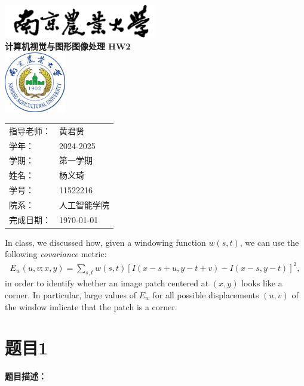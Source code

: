 \documentclass[UTF8]{ctexart}
\begin{document}
	\begin{titlepage}
		\centering
		\vspace*{2cm}
		\includegraphics[width=0.5\textwidth]{./image/name.png}\\[1cm] %
		{\Huge \textbf{计算机视觉与图形图像处理 HW2}}\\[2cm]
		\includegraphics[width=0.2\textwidth]{./image/NJAU.eps}\\[2cm] %
	    \begin{tabular}{ll} %
			{\Large 指导老师：} & {\Large 黄君贤} \\[0.5cm]
			{\Large 学年：} & {\Large 2024-2025} \\[0.5cm]
			{\Large 学期：} & {\Large 第一学期} \\[0.5cm]
			{\Large 姓名：} & {\Large 杨义琦} \\[0.5cm]
			{\Large 学号：} & {\Large 11522216} \\[0.5cm]
			{\Large 院系：} & {\Large 人工智能学院} \\[0.5cm]
			{\Large 完成日期：} & {\Large \today} \\ 
		\end{tabular}
		\vfill
	\end{titlepage}
	
	In class, we discussed how, given a windowing function $w(s,t)$, we can use the following
	\textit{covariance} metric:
	\begin{align}
		E_{w}(u,v;x,y)=\sum_{s,t}w(s,t)[I(x-s+u,y-t+v)-I(x-s,y-t)]^2,
	\end{align}
	in order to identify whether an image patch centered at $(x,y)$ looks like a corner. In particular, large values of $E_w$ for all possible displacements $(u, v)$ of the window indicate that the
	patch is a corner.
	
	\section{题目1}
	\textbf{题目描述：}
	 
\end{document}

